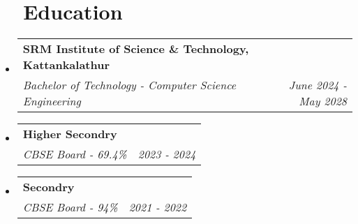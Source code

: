 \documentclass[a4paper,20pt]{article}
\makeatletter
\newcommand{\resumeItemWithoutTitle}[1]{
    \item\small{
            {\vspace{-2pt}}
    }
}
\newcommand{\resumeSubheading}[4]{
    \vspace{-1pt}\item
    \begin{tabular*}{0.97\textwidth}{l@{\extracolsep{\fill}}r}
        \textbf{#1} & #2          \\
        \textit{#3} & \textit{#4} \\
    \end{tabular*}\vspace{-5pt}
}
\newcommand{\resumeSubHeadingListStart}{\begin{itemize}[leftmargin=*]}
\newcommand{\resumeSubHeadingListEnd}{\end{itemize}}
\newcommand{\resumeItemListStart}{\begin{itemize}}
\newcommand{\resumeItemListEnd}{\end{itemize}\vspace{-5pt}}
\makeatother
\begin{document}
\section{~~Education}
\vspace{5pt}
\resumeSubHeadingListStart
\resumeSubheading
{SRM Institute of Science \& Technology, Kattankalathur}{}
{Bachelor of Technology - Computer Science Engineering}{June 2024 - May 2028}
\resumeSubHeadingListEnd
\resumeSubHeadingListStart
\resumeSubheading
{Higher Secondry}{}
{CBSE Board - 69.4\%}{2023 - 2024}
\resumeSubHeadingListEnd
\resumeSubHeadingListStart
\resumeSubheading
{Secondry}{}
{CBSE Board - 94\%}{2021 - 2022}
\resumeSubHeadingListEnd
\vspace{-2pt}


\end{document}

